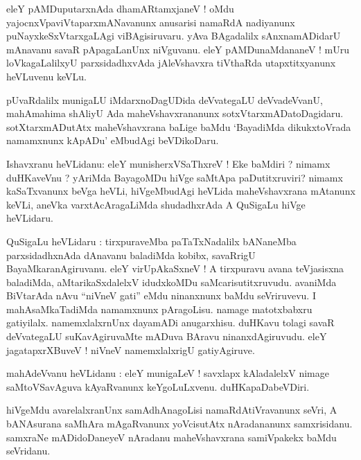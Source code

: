 \documentclass{article}
\begin{document}
\begin{mn}
eleY pAMDuputarxnAda dhamARtamxjaneV !  oMdu yajocnxVpaviVtaparxmANavanunx anusarisi namaRdA 
nadiyanunx  puNayxkeSxVtarxgaLAgi viBAgisiruvaru. yAva BAgadalilx sAnxnamADidarU mAnavanu savaR 
pApagaLanUnx niVguvanu. eleY pAMDunaMdananeV ! mUru loVkagaLalilxyU parxsidadhxvAda jAleVshavxra
tiVthaRda utapxtitxyanunx heVLuvenu keVLu.
\end{mn}

\begin{mn}
pUvaRdalilx munigaLU iMdarxnoDagUDida deVvategaLU deVvadeVvanU, mahAmahima shAliyU Ada 
maheVshavxrananunx sotxVtarxmADatoDagidaru. sotXtarxmADutAtx maheVshavxrana baLige baMdu
`BayadiMda dikukxtoVrada namamxnunx kApADu' eMbudAgi beVDikoDaru.
\end{mn}

\begin{mn}
Ishavxranu heVLidanu: eleY munisherxVSaThxreV ! Eke baMdiri ?  nimamx duHKaveVnu ? yAriMda 
BayagoMDu hiVge saMtApa paDutitxruviri? nimamx kaSaTxvanunx beVga heVLi, hiVgeMbudAgi
heVLida maheVshavxrana mAtanunx keVLi, aneVka varxtAcAragaLiMda shudadhxrAda A QuSigaLu hiVge 
heVLidaru.
\end{mn}

\begin{mn}
QuSigaLu heVLidaru : tirxpuraveMba paTaTxNadalilx bANaneMba parxsidadhxnAda dAnavanu baladiMda 
kobibx, savaRrigU BayaMkaranAgiruvanu. eleY virUpAkaSxneV ! A tirxpuravu avana teVjasisxna 
baladiMda, aMtarikaSxdalelxV idudxkoMDu saMcarisutitxruvudu. avaniMda BiVtarAda nAvu ``niVneV gati''
eMdu ninanxnunx baMdu seVriruvevu. I mahAsaMkaTadiMda namamxnunx pAragoLisu. namage matotxbabxru 
gatiyilalx. namemxlalxrnUnx dayamADi anugarxhisu. duHKavu tolagi savaR deVvategaLU suKavAgiruvaMte 
mADuva BAravu ninanxdAgiruvudu. eleY jagatapxrXBuveV ! niVneV namemxlalxrigU gatiyAgiruve.
\end{mn}

\begin{mn}
mahAdeVvanu heVLidanu : eleY munigaLeV ! savxlapx kAladalelxV nimage saMtoVSavAguva kAyaRvanunx 
keYgoLuLxvenu. duHKapaDabeVDiri.
\end{mn}

\begin{mn}
hiVgeMdu avarelalxranUnx samAdhAnagoLisi namaRdAtiVravanunx seVri, A bANAsurana saMhAra 
mAgaRvanunx yoVcisutAtx nAradananunx samxrisidanu. samxraNe mADidoDaneyeV nAradanu
maheVshavxrana samiVpakekx baMdu seVridanu.
\end{mn}
\end{document}
